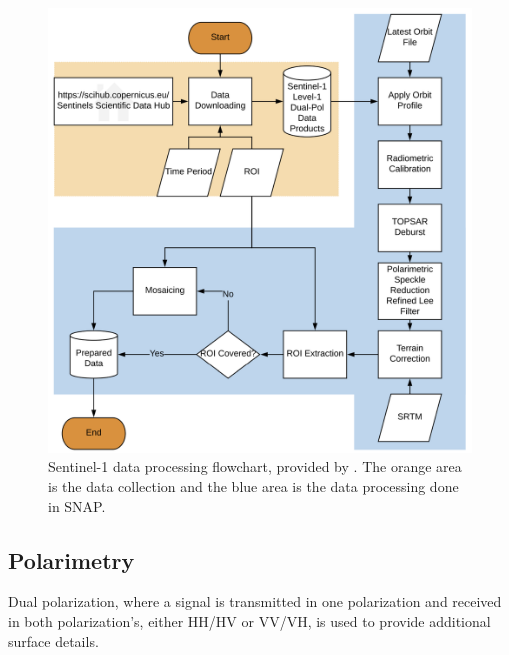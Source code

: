 \documentclass[conference]{IEEEtran}
\begin{document}
		\begin{figure}[htbp]
			\centerline{\includegraphics[scale=0.27]{Images/Hu_2018_Data_Preparation.PNG}}
			\caption{Sentinel-1 data processing flowchart, provided by \cite{Hu_2018}. The orange area is the data collection and the blue area is the data processing done in SNAP.}
			\label{img:Hu_2018_Data_Preparation}
		\end{figure}

	\subsection{Polarimetry}
		Dual polarization, where a signal is transmitted in one polarization and received in both polarization's, either HH/HV or VV/VH, is used to provide additional surface details. 
\end{document}
